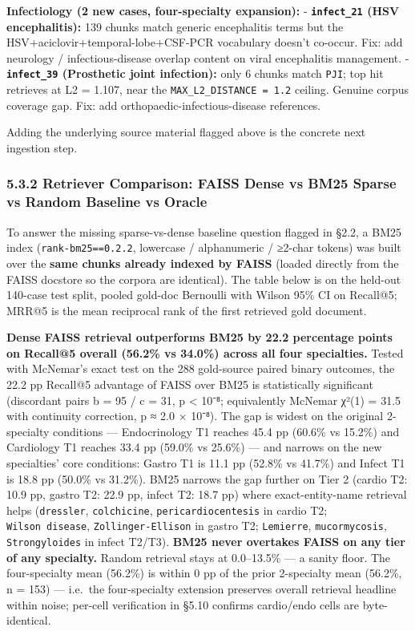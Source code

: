 \documentclass[
  american,
  a4paper,
]{article}
\begin{document}
\textbf{Infectiology (2 new cases, four-specialty expansion):} -
\textbf{\texttt{infect\_21} (HSV encephalitis):} 139 chunks match
generic encephalitis terms but the HSV+aciclovir+temporal-lobe+CSF-PCR
vocabulary doesn't co-occur. Fix: add neurology / infectious-disease
overlap content on viral encephalitis management. -
\textbf{\texttt{infect\_39} (Prosthetic joint infection):} only 6 chunks
match \texttt{PJI}; top hit retrieves at L2 = 1.107, near the
\texttt{MAX\_L2\_DISTANCE\ =\ 1.2} ceiling. Genuine corpus coverage gap.
Fix: add orthopaedic-infectious-disease references.

Adding the underlying source material flagged above is the concrete next
ingestion step.

\subsubsection{5.3.2 Retriever Comparison: FAISS Dense vs BM25 Sparse vs
Random Baseline vs
Oracle}\label{retriever-comparison-faiss-dense-vs-bm25-sparse-vs-random-baseline-vs-oracle}

To answer the missing sparse-vs-dense baseline question flagged in §2.2,
a BM25 index (\texttt{rank-bm25==0.2.2}, lowercase / alphanumeric /
≥2-char tokens) was built over the \textbf{same chunks already indexed
by FAISS} (loaded directly from the FAISS docstore so the corpora are
identical). The table below is on the held-out 140-case test split,
pooled gold-doc Bernoulli with Wilson 95\% CI on Recall@5; MRR@5 is the
mean reciprocal rank of the first retrieved gold document.

\textbf{Dense FAISS retrieval outperforms BM25 by 22.2 percentage points
on Recall@5 overall (56.2\% vs 34.0\%) across all four specialties.}
Tested with McNemar's exact test on the 288 gold-source paired binary
outcomes, the 22.2 pp Recall@5 advantage of FAISS over BM25 is
statistically significant (discordant pairs b = 95 / c = 31, p
\textless{} 10⁻⁸; equivalently McNemar χ²(1) = 31.5 with continuity
correction, p ≈ 2.0 × 10⁻⁸). The gap is widest on the original
2-specialty conditions --- Endocrinology T1 reaches 45.4 pp (60.6\% vs
15.2\%) and Cardiology T1 reaches 33.4 pp (59.0\% vs 25.6\%) --- and
narrows on the new specialties' core conditions: Gastro T1 is 11.1 pp
(52.8\% vs 41.7\%) and Infect T1 is 18.8 pp (50.0\% vs 31.2\%). BM25
narrows the gap further on Tier 2 (cardio T2: 10.9 pp, gastro T2: 22.9
pp, infect T2: 18.7 pp) where exact-entity-name retrieval helps
(\texttt{dressler}, \texttt{colchicine}, \texttt{pericardiocentesis} in
cardio T2; \texttt{Wilson\ disease}, \texttt{Zollinger-Ellison} in
gastro T2; \texttt{Lemierre}, \texttt{mucormycosis},
\texttt{Strongyloides} in infect T2/T3). \textbf{BM25 never overtakes
FAISS on any tier of any specialty.} Random retrieval stays at
0.0--13.5\% --- a sanity floor. The four-specialty mean (56.2\%) is
within 0 pp of the prior 2-specialty mean (56.2\%, n = 153) --- i.e.~the
four-specialty extension preserves overall retrieval headline within
noise; per-cell verification in §5.10 confirms cardio/endo cells are
byte-identical.
\end{document}
